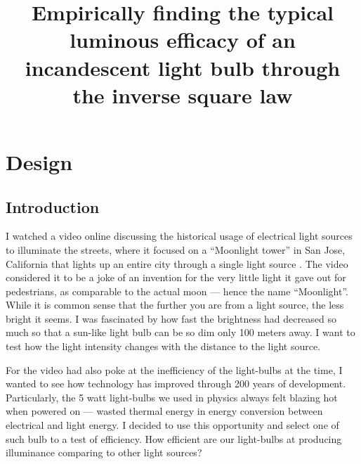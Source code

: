 \documentclass[a4paper,12pt]{article}
\title{Empirically finding the typical luminous efficacy of an incandescent light bulb through the inverse square law}
\author{}
\date{\vspace{-8ex}}
\begin{document}
\maketitle

\section{Design}

\subsection{Introduction}
I watched a video online discussing the historical usage of electrical light sources to illuminate the streets, where it focused on a ``Moonlight tower'' in San Jose, California that lights up an entire city through a single light source \parencite{tower}. The video considered it to be a joke of an invention for the very little light it gave out for pedestrians, as comparable to the actual moon --- hence the name ``Moonlight''. While it is common sense that the further you are from a light source, the less bright it seems. I was fascinated by how fast the brightness had decreased so much so that a sun-like light bulb can be so dim only 100 meters away. I want to test how the light intensity changes with the distance to the light source.

For the video had also poke at the inefficiency of the light-bulbs at the time, I wanted to see how technology has improved through 200 years of development. Particularly, the 5 watt light-bulbs we used in physics always felt blazing hot when powered on --- wasted thermal energy in energy conversion between electrical and light energy. I decided to use this opportunity and select one of such bulb to a test of efficiency. How efficient are our light-bulbs at producing illuminance comparing to other light sources?

\end{document}
